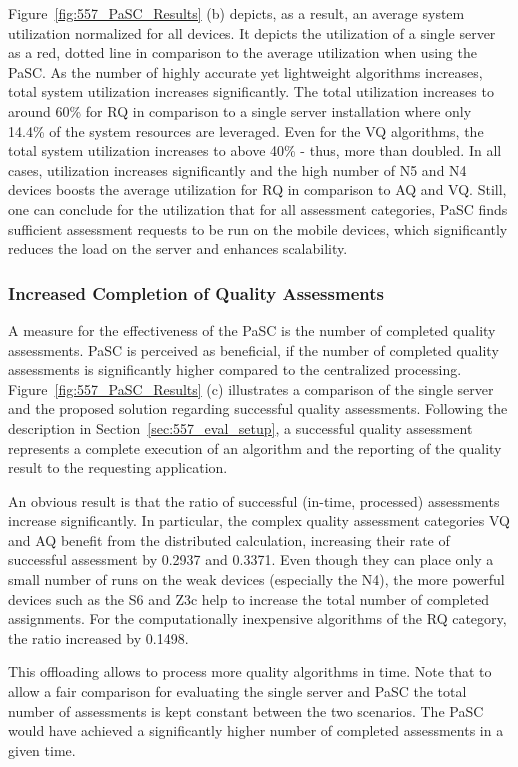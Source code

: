 Figure~\ref{fig:557_PaSC_Results} (b) depicts, as a result, an average system utilization normalized for all devices.
It depicts the utilization of a single server as a red, dotted line in comparison to the average utilization when using the \ac{PaSC}.
As the number of highly accurate yet lightweight algorithms increases, total system utilization increases significantly. 
The total utilization increases to around 60\% for \ac{RQ} in comparison to a single server installation where only 14.4\% of the system resources are leveraged.
Even for the \ac{VQ} algorithms, the total system utilization increases to above 40\% - thus, more than doubled.
In all cases, utilization increases significantly and the high number of N5 and N4 devices boosts the average utilization for \ac{RQ} in comparison to \ac{AQ} and \ac{VQ}.
Still, one can conclude for the utilization that for all assessment categories, \ac{PaSC} finds sufficient assessment requests to be run on the mobile devices, which significantly reduces the load on the server and enhances scalability.
\subsubsection{Increased Completion of Quality Assessments}
A measure for the effectiveness of the \ac{PaSC} is the number of completed quality assessments.
\ac{PaSC} is perceived as beneficial, if the number of completed quality assessments is significantly higher compared to the centralized processing. 
Figure~\ref{fig:557_PaSC_Results} (c) illustrates a comparison of the single server and the proposed solution regarding successful quality assessments.
Following the description in Section~\ref{sec:557_eval_setup}, a successful quality assessment represents a complete execution of an algorithm and the reporting of the quality result to the requesting application. 

An obvious result is that the ratio of successful (in-time, processed) assessments increase significantly. 
In particular, the complex quality assessment categories \ac{VQ} and \ac{AQ} benefit from the distributed calculation, increasing their rate of successful assessment by 0.2937 and 0.3371. 
Even though they can place only a small number of runs on the weak devices (especially the N4), the more powerful devices such as the S6 and Z3c help to increase the total number of completed assignments. 
For the computationally inexpensive algorithms of the \ac{RQ} category, the ratio increased by 0.1498.

This offloading allows to process more quality algorithms in time.
Note that to allow a fair comparison for evaluating the single server and \ac{PaSC} the total number of assessments is kept constant between the two scenarios.
The \ac{PaSC} would have achieved a significantly higher number of completed assessments in a given time. 
